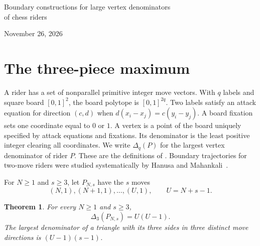 \documentclass[11pt]{article}
\newtheorem{theorem}{Theorem}
\begin{document}
\begin{center}
{\LARGE Boundary constructions for large vertex denominators\\[2pt]of chess riders\par}
\medskip November 26, 2026
\end{center}
\begin{abstract}
We give counterexamples to Conjectures 5.5, 5.8, 5.10 and 6.7 of Chaiken, Hanusa and Zaslavsky. Their candidates for the largest denominator of a vertex are golden parallelograms for three-move riders and twisted Fibonacci spirals for four-move riders. Three pieces suffice to separate the candidates from the maximum: for moves $(j,1)$, $1\le j\le s$, the maximum is $s(s-1)$ and the largest candidate triangle has denominator $(s-1)^2$. Ten ordinary semiqueens attain $9$ and seven tridents attain $8$, exceeding their conjectured maxima $8$ and $7$. A cyclic semiqueen construction grows at the plastic constant per piece. Finally, we give a fixed three-move rider and a fixed four-move rider for which the respective candidates fail for every number of pieces $q\ge3$.
\end{abstract}

\section{The three-piece maximum}
A rider has a set of nonparallel primitive integer move vectors. With $q$ labels and square board $[0,1]^2$, the board polytope is $[0,1]^{2q}$. Two labels satisfy an attack equation for direction $(c,d)$ when $d(x_i-x_j)=c(y_i-y_j)$. A board fixation sets one coordinate equal to $0$ or $1$. A vertex is a point of the board uniquely specified by attack equations and fixations. Its denominator is the least positive integer clearing all coordinates. We write $\Delta_q(P)$ for the largest vertex denominator of rider $P$. These are the definitions of \cite[\S2]{chz}. Boundary trajectories for two-move riders were studied systematically by Hanusa and Mahankali~\cite{billiards}.

For $N\ge1$ and $s\ge3$, let $P_{N,s}$ have the $s$ moves
\[
 (N,1),(N+1,1),\ldots,(U,1),\qquad U=N+s-1.
\]
\begin{theorem}\label{t:three}
For every $N\ge1$ and $s\ge3$,
\[
  \Delta_3(P_{N,s})=U(U-1).
\]
The largest denominator of a triangle with its three sides in three distinct move directions is $(U-1)(s-1)$.
\end{theorem}
\end{document}
